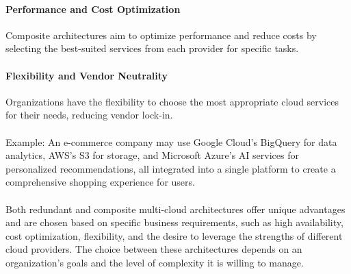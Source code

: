 \paragraph{Performance and Cost Optimization} 
Composite architectures aim to optimize performance and 
reduce costs by selecting the best-suited services from each provider for specific tasks.

\paragraph{Flexibility and Vendor Neutrality}
Organizations have the flexibility to choose the most appropriate cloud services for their needs,
reducing vendor lock-in.
\\\\
Example: An e-commerce company may use Google Cloud's BigQuery for data analytics, AWS's S3 for storage, and Microsoft Azure's AI services for personalized recommendations, all integrated into a single platform to create a comprehensive shopping experience for users.
\\\\
Both redundant and composite multi-cloud architectures offer unique advantages 
and are chosen based on specific business requirements, 
such as high availability, cost optimization, flexibility, 
and the desire to leverage the strengths of different cloud providers. 
The choice between these architectures depends on an organization's goals and the 
level of complexity it is willing to manage.
